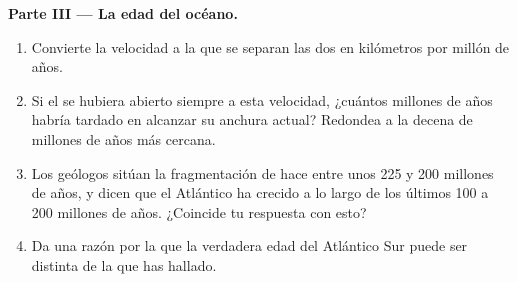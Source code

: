 \begin{problem}
\medskip
\noindent\textbf{Parte III --- La edad del océano.}
\begin{enumerate}[resume]
  \item Convierte la velocidad a la que se separan las dos  en
        kilómetros por millón de años.
  \item Si el  se hubiera abierto siempre a esta velocidad, ¿cuántos
        millones de años habría tardado en alcanzar su anchura actual?
        Redondea a la decena de millones de años más cercana.
  \item Los geólogos sitúan la fragmentación de  hace entre unos 225 y
        200 millones de años, y dicen que el Atlántico ha crecido a lo largo
        de los últimos 100 a 200 millones de años. ¿Coincide tu respuesta
        con esto?
  \item Da una razón por la que la verdadera edad del Atlántico Sur puede
        ser distinta de la que has hallado.
\end{enumerate}
\end{problem}
